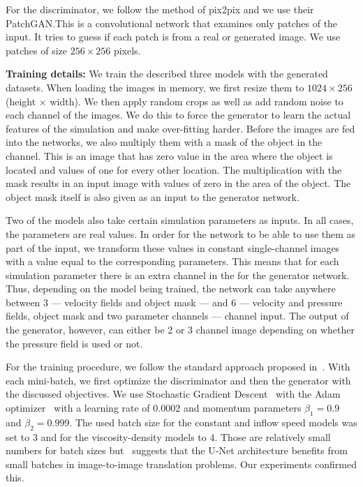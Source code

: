 \documentclass{llncs}
\begin{document}
For the discriminator, we follow the method of pix2pix and we use their PatchGAN.\@ This is a convolutional network that examines only patches of the input. It tries to guess if each patch is from a real or generated image. We use patches of size $256\times 256$ pixels.

\noindent\textbf{Training details:} We train the described three models with the generated datasets. When loading the images in memory, we first resize them to $1024\times 256$ (height $\times$ width). We then apply random crops as well as add random noise to each channel of the images. We do this to force the generator to learn the actual features of the simulation and make over-fitting harder. Before the images are fed into the networks, we also multiply them with a mask of the object in the channel. This is an image that has zero value in the area where the object is located and values of one for every other location. The multiplication with the mask results in an input image with values of zero in the area of the object. The object mask itself is also given as an input to the generator network.

Two of the models also take certain simulation parameters as inputs. In all cases, the parameters are real values. In order for the network to be able to use them as part of the input, we transform these values in constant single-channel images with a value equal to the corresponding parameters. This means that for each simulation parameter there is an extra channel in the for the generator network. Thus, depending on the model being trained, the network can take anywhere between 3 --- velocity fields and object mask --- and 6 --- velocity and pressure fields, object mask and two parameter channels --- channel input. The output of the generator, however, can either be 2 or 3 channel image depending on whether the pressure field is used or not.

For the training procedure, we follow the standard approach proposed in~\cite{goodfellow2014}. With each mini-batch, we first optimize the discriminator and then the generator with the discussed objectives. We use Stochastic Gradient Descent~\cite{kiefer1952} with the Adam optimizer~\cite{kingma2014} with a learning rate of $0.0002$ and momentum parameters $\beta_1=0.9$ and $\beta_2=0.999$. The used batch size for the constant and inflow speed models was set to 3 and for the viscosity-density models to 4. Those are relatively small numbers for batch sizes but~\cite{pix2pix} suggests that the U-Net architecture benefits from small batches in image-to-image translation problems. Our experiments confirmed this.
\end{document}
